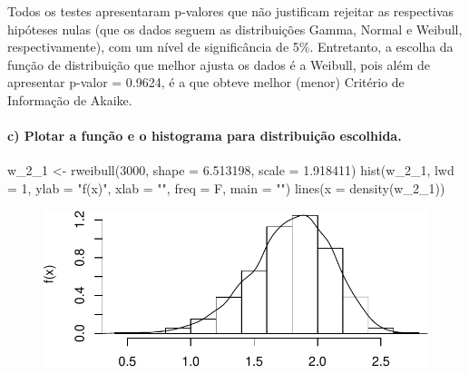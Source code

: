 \documentclass[
  letterpaper,
  DIV=11,
  numbers=noendperiod]{scrartcl}
\let\oldparagraph\paragraph
\renewcommand{\paragraph}[1]{\oldparagraph{#1}\mbox{}}
\newenvironment{Shaded}{\begin{snugshade}}{\end{snugshade}}
\newcommand{\AttributeTok}[1]{\textcolor[rgb]{0.40,0.45,0.13}{#1}}
\newcommand{\DecValTok}[1]{\textcolor[rgb]{0.68,0.00,0.00}{#1}}
\newcommand{\FloatTok}[1]{\textcolor[rgb]{0.68,0.00,0.00}{#1}}
\newcommand{\FunctionTok}[1]{\textcolor[rgb]{0.28,0.35,0.67}{#1}}
\newcommand{\NormalTok}[1]{\textcolor[rgb]{0.00,0.23,0.31}{#1}}
\newcommand{\OtherTok}[1]{\textcolor[rgb]{0.00,0.23,0.31}{#1}}
\newcommand{\StringTok}[1]{\textcolor[rgb]{0.13,0.47,0.30}{#1}}
\begin{document}
Todos os testes apresentaram p-valores que não justificam rejeitar as
respectivas hipóteses nulas (que os dados seguem as distribuições Gamma,
Normal e Weibull, respectivamente), com um nível de significância de
5\%. Entretanto, a escolha da função de distribuição que melhor ajusta
os dados é a Weibull, pois além de apresentar p-valor = 0.9624, é a que
obteve melhor (menor) Critério de Informação de Akaike.

\hypertarget{c-plotar-a-funuxe7uxe3o-e-o-histograma-para-distribuiuxe7uxe3o-escolhida.}{%
\paragraph{c) Plotar a função e o histograma para distribuição
escolhida.}\label{c-plotar-a-funuxe7uxe3o-e-o-histograma-para-distribuiuxe7uxe3o-escolhida.}}

\begin{Shaded}
\begin{Highlighting}[]
\NormalTok{w\_2\_1 }\OtherTok{\textless{}{-}} \FunctionTok{rweibull}\NormalTok{(}\DecValTok{3000}\NormalTok{, }\AttributeTok{shape =} \FloatTok{6.513198}\NormalTok{, }\AttributeTok{scale =} \FloatTok{1.918411}\NormalTok{)}
\FunctionTok{hist}\NormalTok{(w\_2\_1, }\AttributeTok{lwd =} \DecValTok{1}\NormalTok{, }\AttributeTok{ylab =} \StringTok{"f(x)"}\NormalTok{, }\AttributeTok{xlab =} \StringTok{""}\NormalTok{, }\AttributeTok{freq =}\NormalTok{ F, }\AttributeTok{main =} \StringTok{""}\NormalTok{)}
\FunctionTok{lines}\NormalTok{(}\AttributeTok{x =} \FunctionTok{density}\NormalTok{(w\_2\_1))}
\end{Highlighting}
\end{Shaded}

\begin{figure}[H]

{\centering \includegraphics{quiz5_files/figure-pdf/unnamed-chunk-20-1.pdf}

}

\end{figure}
\end{document}
